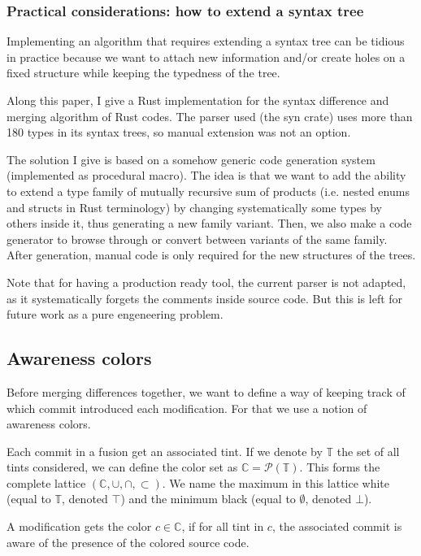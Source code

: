 \documentclass[a4paper,10pt]{article}
\begin{document}
\subsubsection{Practical considerations: how to extend a syntax tree}
Implementing an algorithm that requires extending a syntax tree can be tidious in practice because we want to attach new information and/or create holes on a fixed structure while keeping the typedness of the tree.

Along this paper, I give a Rust implementation for the syntax difference and merging algorithm of Rust codes. The parser used (the syn crate) uses more than 180 types in its syntax trees, so manual extension was not an option.

The solution I give is based on a somehow generic code generation system (implemented as procedural macro). The idea is that we want to add the ability to extend a type family of mutually recursive sum of products (i.e. nested enums and structs in Rust terminology) by changing systematically some types by others inside it, thus generating a new family variant. Then, we also make a code generator to browse through or convert between variants of the same family. After generation, manual code is only required for the new structures of the trees.

Note that for having a production ready tool, the current parser is not adapted, as it systematically forgets the comments inside source code. But this is left for future work as a pure engeneering problem.

\subsection{Awareness colors}

Before merging differences together, we want to define a way of keeping track of which commit introduced each modification. For that we use a notion of awareness colors.

Each commit in a fusion get an associated tint. If we denote by $\mathbb{T}$ the set of all tints considered, we can define the color set as $\mathbb{C} = \mathcal{P}(\mathbb{T})$. This forms the complete lattice $(\mathbb{C}, \cup, \cap, \subset)$. We name the maximum in this lattice white (equal to $\mathbb{T}$, denoted $\top$) and the minimum black (equal to $\emptyset$, denoted $\bot$).

A modification gets the color $c \in \mathbb{C}$, if for all tint in $c$, the associated commit is aware of the presence of the colored source code.
\end{document}
